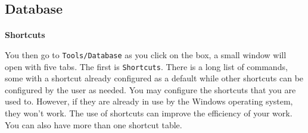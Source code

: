 
\subsection{Database}

\paragraph{}\textbf{Shortcuts}\\

You then go to \texttt{Tools/Database} as you click on the box, a small window will open with five tabs.
The first is \texttt{Shortcuts}. There is a long list of commands, some with a shortcut already configured
as a default while other shortcuts can be configured by the user as needed.
You may configure the shortcuts that you are used to. However,
if they are already in use by the Windows operating system, they won't work.
The use of shortcuts can improve the efficiency of your work. You can also have more than one shortcut table.


